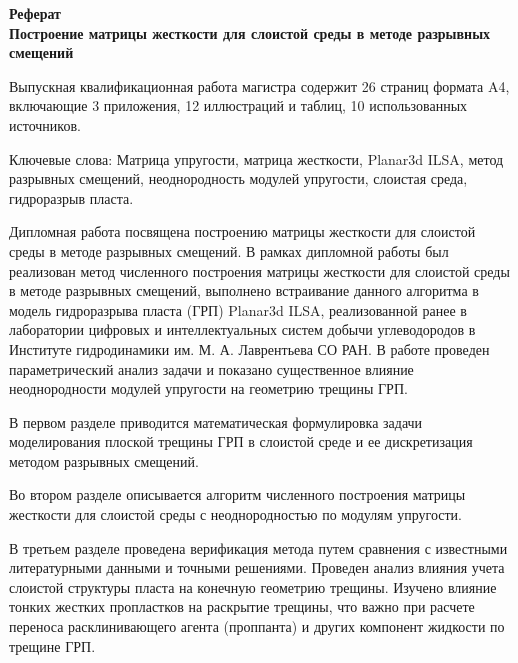 \documentclass[a4paper,12pt]{article}
\begin{document}
\begin{center}
    \textbf{
        \hfill \break
        Реферат\\
        \hfill \break
        Построение матрицы жесткости для слоистой среды в методе разрывных смещений \\
    }
\end{center}

Выпускная квалификационная работа магистра содержит 26 страниц формата A4, включающие 3 приложения, 12 иллюстраций и таблиц, 10 использованных источников.

Ключевые слова: Матрица упругости, матрица жесткости, Planar3d ILSA, метод разрывных смещений, неоднородность модулей упругости, слоистая среда, гидроразрыв пласта.

Дипломная работа посвящена построению матрицы жесткости для слоистой среды в методе разрывных смещений. В рамках дипломной работы был реализован метод численного построения матрицы жесткости для слоистой среды в методе разрывных смещений, выполнено встраивание данного алгоритма в модель гидроразрыва пласта (ГРП) Planar3d ILSA, реализованной ранее в лаборатории цифровых и интеллектуальных систем добычи углеводородов в Институте гидродинамики им. М. А. Лаврентьева СО РАН. В работе проведен параметрический анализ задачи и показано существенное влияние неоднородности модулей упругости на геометрию трещины ГРП.

В первом разделе приводится математическая формулировка задачи моделирования плоской трещины ГРП в слоистой среде и ее дискретизация методом разрывных смещений.

Во втором разделе описывается алгоритм численного построения матрицы жесткости для слоистой среды с неоднородностью по модулям упругости.

В третьем разделе проведена верификация метода путем сравнения с известными литературными данными и точными решениями. Проведен анализ влияния учета слоистой структуры пласта на конечную геометрию трещины.
Изучено влияние тонких жестких пропластков на раскрытие трещины, что важно при расчете переноса расклинивающего агента (проппанта) и других компонент жидкости по трещине ГРП.


\thispagestyle{empty} %
\end{document}
